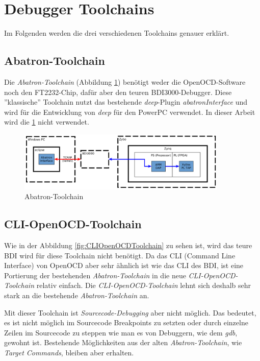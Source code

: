 \FloatBarrier
\section{Debugger Toolchains}
Im Folgenden werden die drei verschiedenen Toolchains genauer erklärt.

\subsection{Abatron-Toolchain}
Die \textit{Abatron-Toolchain} (Abbildung \ref{fig:AbatronToolchain}) benötigt weder die OpenOCD-Software noch den FT2232-Chip, dafür aber den teuren BDI3000-Debugger.
Diese ''klassische'' Toolchain nutzt das bestehende \textit{deep}-Plugin \textit{abatronInterface} und wird für die Entwicklung von \textit{deep} für den PowerPC verwendet.
In dieser Arbeit wird die \ref{fig:AbatronToolchain} nicht verwendet.

\begin{figure}[htbp]
	\centering
		\includegraphics[width=10cm,height=\textheight,keepaspectratio]{graphs/abatronToolchain.png}
	\caption{Abatron-Toolchain}
	\label{fig:AbatronToolchain}
\end{figure}


\FloatBarrier
\subsection{CLI-OpenOCD-Toolchain}
Wie in der Abbildung \ref{fig:CLIOpenOCDToolchain} zu sehen ist, wird das teure BDI wird für diese Toolchain nicht  benötigt.
Da das CLI (Command Line Interface) von OpenOCD aber sehr ähnlich ist wie das CLI des BDI, ist eine Portierung der bestehenden \textit{Abatron-Toolchain} in die neue \textit{CLI-OpenOCD-Toolchain} relativ einfach.
Die \textit{CLI-OpenOCD-Toolchain} lehnt sich deshalb sehr stark an die bestehende \textit{Abatron-Toolchain} an.

Mit dieser Toolchain ist \textit{Sourcecode-Debugging} aber nicht möglich.
Das bedeutet, es ist nicht möglich im Sourcecode Breakpoints zu setzten oder durch einzelne Zeilen im Sourcecode zu steppen wie man es von Debuggern, wie dem \textit{gdb}, gewohnt ist.
Bestehende Möglichkeiten aus der alten \textit{Abatron-Toolchain}, wie \textit{Target Commands}, bleiben aber erhalten.

